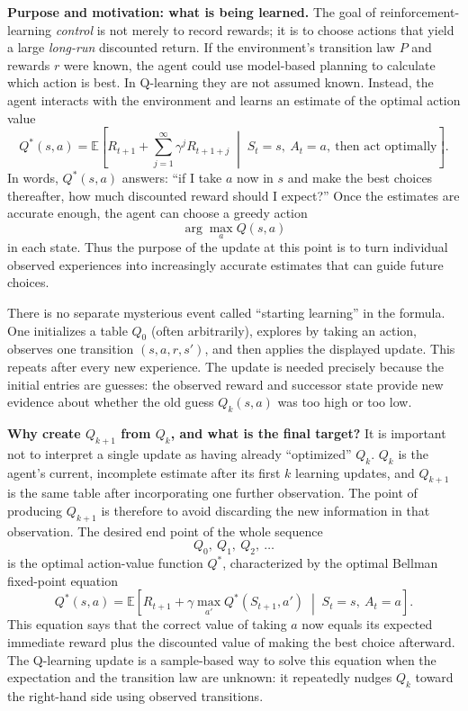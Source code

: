 \documentclass[11pt,a4paper]{article}
\theoremstyle{definition}
\begin{document}
\begin{note}
\noindent\textbf{Purpose and motivation: what is being learned.}
The goal of reinforcement-learning \emph{control} is not merely to record rewards; it is to
choose actions that yield a large \emph{long-run} discounted return. If the environment's
transition law $P$ and rewards $r$ were known, the agent could use model-based planning to
calculate which action is best. In Q-learning they are not assumed known. Instead, the agent
interacts with the environment and learns an estimate of the optimal action value
\[
Q^*(s,a)
=\mathbb{E}\!\left[
R_{t+1}+\sum_{j=1}^{\infty}\gamma^jR_{t+1+j}
\;\middle|\;
S_t=s,\ A_t=a,\ \text{then act optimally}
\right].
\]
In words, $Q^*(s,a)$ answers: ``if I take $a$ now in $s$ and make the best choices thereafter,
how much discounted reward should I expect?'' Once the estimates are accurate enough, the
agent can choose a greedy action
\[
\arg\max_a Q(s,a)
\]
in each state. Thus the purpose of the update at this point is to turn individual observed
experiences into increasingly accurate estimates that can guide future choices.

There is no separate mysterious event called ``starting learning'' in the formula. One
initializes a table $Q_0$ (often arbitrarily), explores by taking an action, observes one
transition $(s,a,r,s')$, and then applies the displayed update. This repeats after every new
experience. The update is needed precisely because the initial entries are guesses: the
observed reward and successor state provide new evidence about whether the old guess
$Q_k(s,a)$ was too high or too low.

\medskip\noindent\textbf{Why create \(Q_{k+1}\) from \(Q_k\), and what is the final target?}
It is important not to interpret a single update as having already ``optimized'' $Q_k$.
$Q_k$ is the agent's current, incomplete estimate after its first $k$ learning updates, and
$Q_{k+1}$ is the same table after incorporating one further observation. The point of producing
$Q_{k+1}$ is therefore to avoid discarding the new information in that observation. The desired
end point of the whole sequence
\[
Q_0,\ Q_1,\ Q_2,\ \ldots
\]
is the optimal action-value function $Q^*$, characterized by the optimal Bellman fixed-point
equation
\[
Q^*(s,a)
=\mathbb{E}\!\left[
R_{t+1}+\gamma\max_{a'}Q^*(S_{t+1},a')
\;\middle|\;
S_t=s,\ A_t=a
\right].
\]
This equation says that the correct value of taking $a$ now equals its expected immediate
reward plus the discounted value of making the best choice afterward. The Q-learning update is
a sample-based way to solve this equation when the expectation and the transition law are
unknown: it repeatedly nudges $Q_k$ toward the right-hand side using observed transitions.


\end{note}
\end{document}
